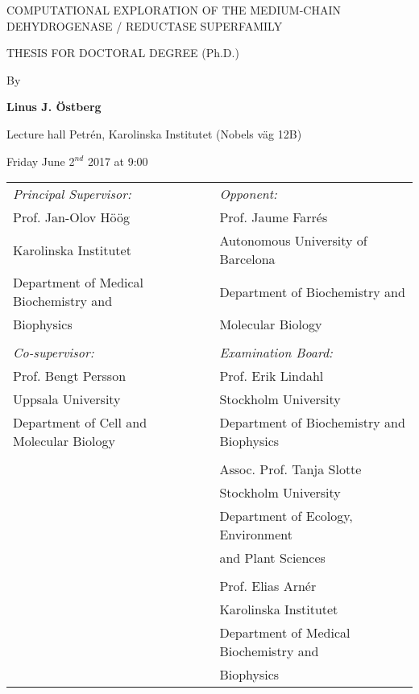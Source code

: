 \documentclass[a4paper, 12pt]{report}
\def\thesistitle{Computational Exploration of the Medium-Chain Dehydrogenase / Reductase Superfamily}
\def\thesisauthor{Linus J. Östberg}
\begin{document}

{\Large \noindent \MakeUppercase{\thesistitle}\par}
\vspace{0.5cm}
{\Large \noindent THESIS FOR DOCTORAL DEGREE (Ph.D.) \par}
\vspace{0.5cm}
{\noindent By \par}
\vspace{0.5cm}
{\Large \noindent \bf \thesisauthor\par}
\vspace{0.5cm}


{\large \noindent Lecture hall Petrén, Karolinska Institutet (Nobels väg 12B)\par
\vspace{0.1cm}
\noindent Friday June 2$^{nd}$ 2017 at 9:00\par}
\vspace{0.5cm}
{\small
\begin{flushleft}
\begin{tabularx}{\textwidth}{lXl}
{\em Principal Supervisor:} & & {\em Opponent:}\\
Prof. Jan-Olov Höög & & Prof. Jaume Farrés\\
Karolinska Institutet & & Autonomous University of Barcelona\\
Department of Medical Biochemistry and & & Department of Biochemistry and \\
Biophysics & & Molecular Biology\\
\\
{\em Co-supervisor:} & & {\em Examination Board:}\\
Prof. Bengt Persson & & Prof. Erik Lindahl\\
Uppsala University & & Stockholm University\\
Department of Cell and Molecular Biology & & Department of Biochemistry and Biophysics\\
\\
& & Assoc. Prof. Tanja Slotte\\
& & Stockholm University\\
& & Department of Ecology, Environment \\
& & and Plant Sciences\\
\\
& & Prof. Elias Arnér\\
& & Karolinska Institutet\\
& & Department of Medical Biochemistry and\\
& & Biophysics\\
\end{tabularx}
\end{flushleft}
}
\end{document}
